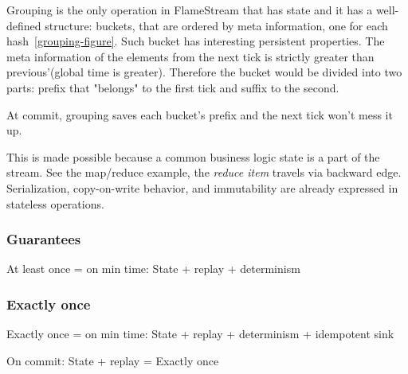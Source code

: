Grouping is the only operation in FlameStream that has state and it has a well-defined structure: buckets, that are ordered by meta information, one for each hash~\ref{grouping-figure}. Such bucket has interesting persistent properties. The meta information of the elements from the next tick is strictly greater than previous'(global time is greater). Therefore the bucket would be divided into two parts: prefix that "belongs" to the first tick and suffix to the second.

At commit, grouping saves each bucket's prefix and the next tick won't mess it up.

This is made possible because a common business logic state is a part of the stream. See the map/reduce example, the {\it reduce item} travels via backward edge. Serialization, copy-on-write behavior, and immutability are already expressed in stateless operations.

\subsubsection{Guarantees}
At least once = on min time: State + replay + determinism

\subsubsection{Exactly once}
Exactly once = on min time: State + replay + determinism + idempotent sink

On commit: State + replay = Exactly once

